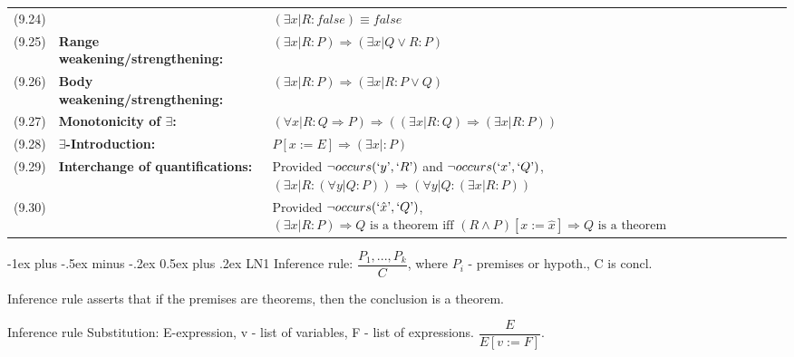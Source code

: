 \documentclass[letterpaper, 8pt]{extarticle}
\makeatletter
\renewcommand{\section}{\@startsection{section}{1}{0mm}%
                                {-1ex plus -.5ex minus -.2ex}%
                                {0.5ex plus .2ex}%
                                {\normalfont\normalsize\bfseries}}
\newcommand{\To}{\Rightarrow}
\makeatother
\begin{document}
\begin{multicols*}{3}
\begin{tabulary}{\linewidth}{@{}lLL@{}}
        (9.24) &                                                    & $(\exists x | R : false) \equiv false$                                                                                                                                     \\
        (9.25) & \textbf{Range weakening/strengthening:}            & $(\exists x | R : P) \To (\exists x | Q \lor R : P)$                                                                                                                       \\
        (9.26) & \textbf{Body weakening/strengthening:}             & $(\exists x | R : P) \To (\exists x | R : P \lor Q)$                                                                                                                       \\
        (9.27) & \textbf{Monotonicity of $\exists$:}                & $(\forall x | R : Q \To P) \To ((\exists x | R : Q) \To (\exists x | R : P ))$                                                                                             \\
        (9.28) & \textbf{$\exists$-Introduction:}                   & $P[x := E] \To (\exists x |: P)$                                                                                                                                           \\
        (9.29) & \textbf{Interchange of quantifications:}           & Provided $\neg occurs(`y\textrm', `R\textrm')$ and $\neg occurs(`x\textrm', `Q\textrm')$, $(\exists x | R: (\forall y | Q : P)) \To (\forall y | Q : (\exists x | R : P))$ \\
        (9.30) &                                                    & Provided $\neg occurs(`\hat{x}\textrm', `Q\textrm')$, $(\exists x | R : P) \To Q \text{ is a theorem iff } (R \land P)[x := \hat{x}] \To Q \text{ is a theorem}$           \\
    \end{tabulary}

    \section{LN1}
    Inference rule: $\dfrac{P_1,...,P_k}{C}$, where $P_i$ - premises or hypoth., C is concl.

    Inference rule asserts that if the premises are theorems, then the conclusion is a theorem.

    Inference rule Substitution: E-expression, v - list of variables, F - list of expressions. $\dfrac{E}{E[v:=F]}$.


\end{multicols*}
\end{document}
